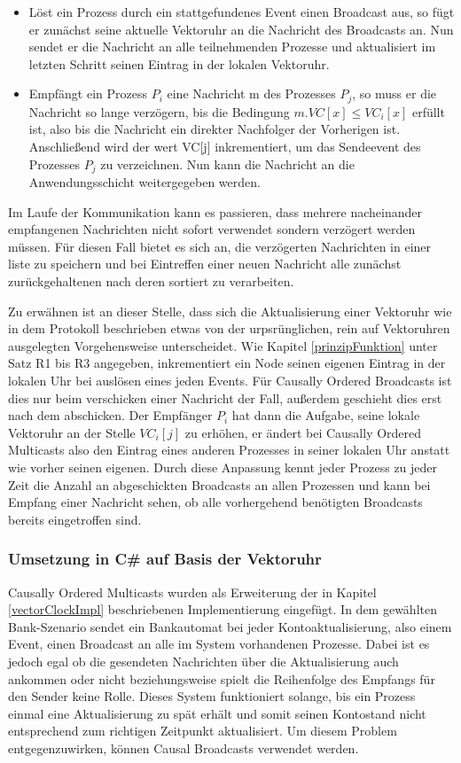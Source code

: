 \begin{itemize}
	\item Löst ein Prozess durch ein stattgefundenes Event einen Broadcast aus, so fügt er zunächst seine aktuelle Vektoruhr an die Nachricht des Broadcasts an. Nun sendet er die Nachricht an alle teilnehmenden Prozesse und aktualisiert im letzten Schritt seinen Eintrag in der lokalen Vektoruhr.
	\item Empfängt ein Prozess $P_i$ eine Nachricht m des Prozesses $P_j$, so muss er die Nachricht so lange verzögern, bis die Bedingung $m.VC[x] \le VC_i[x]$ erfüllt ist, also bis die Nachricht ein direkter Nachfolger der Vorherigen ist. Anschließend wird der wert VC[j] inkrementiert, um das Sendeevent des Prozesses $P_j$ zu verzeichnen. Nun kann die Nachricht an die Anwendungsschicht weitergegeben werden.
\end{itemize}

Im Laufe der Kommunikation kann es passieren, dass mehrere nacheinander empfangenen Nachrichten nicht sofort verwendet sondern verzögert werden müssen. Für diesen Fall bietet es sich an, die verzögerten Nachrichten in einer liste zu speichern und bei Eintreffen einer neuen Nachricht alle zunächst zurückgehaltenen nach deren  sortiert zu verarbeiten.

Zu erwähnen ist an dieser Stelle, dass sich die Aktualisierung einer Vektoruhr wie in dem Protokoll beschrieben etwas von der urpsrünglichen, rein auf Vektoruhren ausgelegten Vorgehensweise unterscheidet. Wie Kapitel \ref{prinzipFunktion} unter Satz R1 bis R3 angegeben, inkrementiert ein Node seinen eigenen Eintrag in der lokalen Uhr bei auslösen eines jeden Events. Für Causally Ordered Broadcasts ist dies nur beim verschicken einer Nachricht der Fall, außerdem geschieht dies erst nach dem abschicken. Der Empfänger $P_i$ hat dann die Aufgabe, seine lokale Vektoruhr an der Stelle $VC_i[j]$ zu erhöhen, er ändert bei Causally Ordered Multicasts also den Eintrag eines anderen Prozesses in seiner lokalen Uhr anstatt wie vorher seinen eigenen. Durch diese Anpassung kennt jeder Prozess zu jeder Zeit die Anzahl an abgeschickten Broadcasts an allen Prozessen und kann bei Empfang einer Nachricht sehen, ob alle vorhergehend benötigten Broadcasts bereits eingetroffen sind.

\subsubsection{Umsetzung in C\# auf Basis der Vektoruhr}
Causally Ordered Multicasts wurden als Erweiterung der in Kapitel \ref{vectorClockImpl} beschriebenen Implementierung eingefügt. In dem gewählten Bank-Szenario sendet ein Bankautomat bei jeder Kontoaktualisierung, also einem Event, einen Broadcast an alle im System vorhandenen Prozesse. Dabei ist es jedoch egal ob die gesendeten Nachrichten über die Aktualisierung auch ankommen oder nicht beziehungsweise spielt die Reihenfolge des Empfangs für den Sender keine Rolle. Dieses System funktioniert solange, bis ein Prozess einmal eine Aktualisierung zu spät erhält und somit seinen Kontostand nicht entsprechend zum richtigen Zeitpunkt aktualisiert. Um diesem Problem entgegenzuwirken, können Causal Broadcasts verwendet werden.

